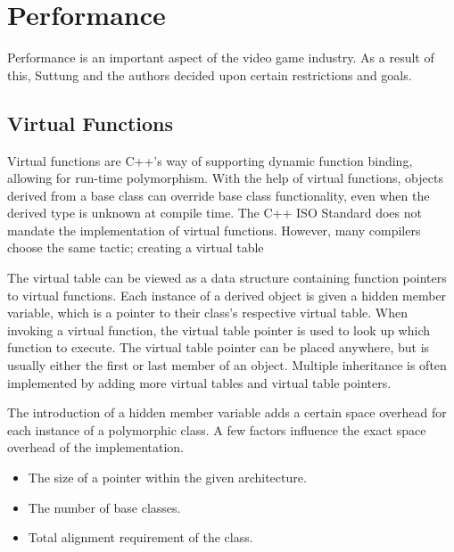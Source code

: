 
\section{Performance}
Performance is an important aspect of the video game industry.
As a result of this, Suttung and the authors decided upon certain restrictions and goals.

\subsection{Virtual Functions}
\label{subsec:requirements_performance_virtual_functions}
Virtual functions are C++'s way of supporting dynamic function binding, allowing for run-time polymorphism.
With the help of virtual functions, objects derived from a base class can override base class functionality, even when the derived type is unknown at compile time.
The C++ ISO Standard does not mandate the implementation of virtual functions.
However, many compilers choose the same tactic; creating a virtual table\cite[p. 140]{game_engine_architecture}

The virtual table can be viewed as a data structure containing function pointers to virtual functions.
Each instance of a derived object is given a hidden member variable, which is a pointer to their class's respective virtual table.
When invoking a virtual function, the virtual table pointer is used to look up which function to execute.
The virtual table pointer can be placed anywhere, but is usually either the first or last member of an object.
Multiple inheritance is often implemented by adding more virtual tables and virtual table pointers\cite{codersource_virtual_functions}\cite[31:12]{andrei_alexandrescu_quick_code_quickly}.

The introduction of a hidden member variable adds a certain space overhead for each instance of a polymorphic class.
A few factors influence the exact space overhead of the implementation.
\begin{itemize}
    \item
    The size of a pointer within the given architecture.

    \item
    The number of base classes.

    \item
    Total alignment requirement of the class.
\end{itemize}

